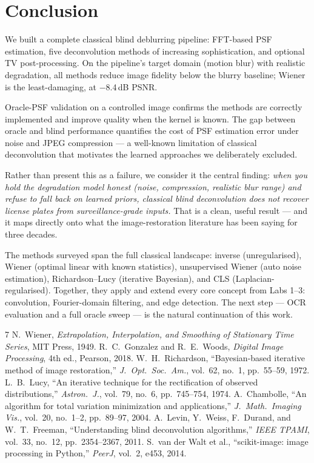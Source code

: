 \documentclass[12pt,a4paper]{article}
\begin{document}
\section{Conclusion}

We built a complete classical blind deblurring pipeline: FFT-based PSF
estimation, five deconvolution methods of increasing sophistication, and
optional TV post-processing. On the pipeline's target domain (motion
blur) with realistic degradation, all methods reduce image fidelity
below the blurry baseline; Wiener is the least-damaging, at $-$8.4\,dB
PSNR.

Oracle-PSF validation on a controlled image confirms the methods are
correctly implemented and improve quality when the kernel is known. The
gap between oracle and blind performance quantifies the cost of PSF
estimation error under noise and JPEG compression --- a well-known
limitation of classical deconvolution that motivates the learned
approaches we deliberately excluded.

Rather than present this as a failure, we consider it the central
finding: \textit{when you hold the degradation model honest (noise,
compression, realistic blur range) and refuse to fall back on learned
priors, classical blind deconvolution does not recover license plates
from surveillance-grade inputs.} That is a clean, useful result ---
and it maps directly onto what the image-restoration literature has
been saying for three decades.

The methods surveyed span the full classical landscape: inverse
(unregularised), Wiener (optimal linear with known statistics),
unsupervised Wiener (auto noise estimation), Richardson--Lucy
(iterative Bayesian), and CLS (Laplacian-regularised). Together, they
apply and extend every core concept from Labs 1--3: convolution,
Fourier-domain filtering, and edge detection. The next step --- OCR
evaluation and a full oracle sweep --- is the natural continuation of
this work.

\begin{thebibliography}{7}
 N.~Wiener, \textit{Extrapolation, Interpolation, and Smoothing of Stationary Time Series}, MIT Press, 1949.
 R.~C.~Gonzalez and R.~E.~Woods, \textit{Digital Image Processing}, 4th ed., Pearson, 2018.
 W.~H.~Richardson, ``Bayesian-based iterative method of image restoration,'' \textit{J.~Opt.~Soc.~Am.}, vol.~62, no.~1, pp.~55--59, 1972.
 L.~B.~Lucy, ``An iterative technique for the rectification of observed distributions,'' \textit{Astron.~J.}, vol.~79, no.~6, pp.~745--754, 1974.
 A.~Chambolle, ``An algorithm for total variation minimization and applications,'' \textit{J.~Math.~Imaging Vis.}, vol.~20, no.~1--2, pp.~89--97, 2004.
 A.~Levin, Y.~Weiss, F.~Durand, and W.~T.~Freeman, ``Understanding blind deconvolution algorithms,'' \textit{IEEE TPAMI}, vol.~33, no.~12, pp.~2354--2367, 2011.
 S.~van der Walt et al., ``scikit-image: image processing in Python,'' \textit{PeerJ}, vol.~2, e453, 2014.
\end{thebibliography}
\end{document}
